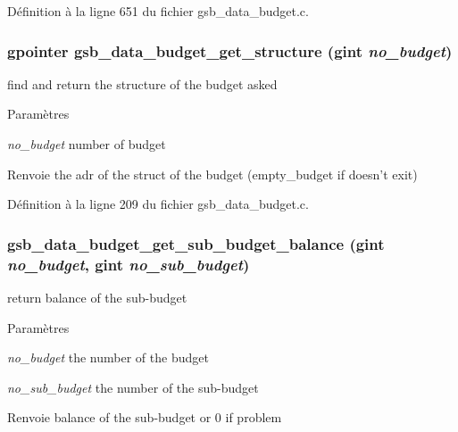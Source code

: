 Définition à la ligne 651 du fichier gsb\_\-data\_\-budget.c.

\subsubsection[{gsb\_\-data\_\-budget\_\-get\_\-structure}]{\setlength{\rightskip}{0pt plus 5cm}gpointer gsb\_\-data\_\-budget\_\-get\_\-structure (gint {\em no\_\-budget})}\label{gsb__data__budget_8h_ace802eb38829d136f54f4f7b981a29c6}
find and return the structure of the budget asked


\begin{DoxyParams}{Paramètres}
\item[{\em no\_\-budget}]number of budget\end{DoxyParams}
\begin{DoxyReturn}{Renvoie}
the adr of the struct of the budget (empty\_\-budget if doesn't exit) 
\end{DoxyReturn}


Définition à la ligne 209 du fichier gsb\_\-data\_\-budget.c.

\subsubsection[{gsb\_\-data\_\-budget\_\-get\_\-sub\_\-budget\_\-balance}]{ gsb\_\-data\_\-budget\_\-get\_\-sub\_\-budget\_\-balance (gint {\em no\_\-budget}, \/  gint {\em no\_\-sub\_\-budget})}\label{gsb__data__budget_8h_a6585ddd55f0d3b807f5319250c115ec7}
return balance of the sub-\/budget


\begin{DoxyParams}{Paramètres}
\item[{\em no\_\-budget}]the number of the budget \item[{\em no\_\-sub\_\-budget}]the number of the sub-\/budget\end{DoxyParams}
\begin{DoxyReturn}{Renvoie}
balance of the sub-\/budget or 0 if problem 
\end{DoxyReturn}


